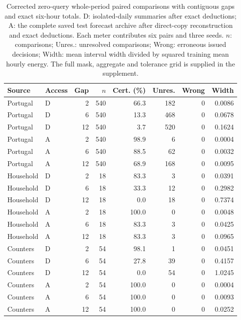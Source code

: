 \documentclass[12pt]{article}
\begin{document}
\begin{table}[htbp]
\centering\normalsize\setlength{\tabcolsep}{4pt}
\caption{Corrected zero-query whole-period paired comparisons with contiguous gaps and exact six-hour totals. D: isolated-daily summaries after exact deductions; A: the complete saved test forecast archive after direct-copy reconstruction and exact deductions. Each meter contributes six pairs and three seeds. $n$: comparisons; Unres.: unresolved comparisons; Wrong: erroneous issued decisions; Width: mean interval width divided by squared training mean hourly energy. The full mask, aggregate and tolerance grid is supplied in the supplement.}
\label{tab:period}
\begin{tabular}{llrrrrrr}
\toprule
Source & Access & Gap & $n$ & Cert. (\%) & Unres. & Wrong & Width\\
\midrule
Portugal & D & 2 & 540 & 66.3 & 182 & 0 & 0.0086\\
Portugal & D & 6 & 540 & 13.3 & 468 & 0 & 0.0678\\
Portugal & D & 12 & 540 & 3.7 & 520 & 0 & 0.1624\\
Portugal & A & 2 & 540 & 98.9 & 6 & 0 & 0.0004\\
Portugal & A & 6 & 540 & 88.5 & 62 & 0 & 0.0032\\
Portugal & A & 12 & 540 & 68.9 & 168 & 0 & 0.0095\\
Household & D & 2 & 18 & 83.3 & 3 & 0 & 0.0391\\
Household & D & 6 & 18 & 33.3 & 12 & 0 & 0.2982\\
Household & D & 12 & 18 & 0.0 & 18 & 0 & 0.7374\\
Household & A & 2 & 18 & 100.0 & 0 & 0 & 0.0048\\
Household & A & 6 & 18 & 83.3 & 3 & 0 & 0.0425\\
Household & A & 12 & 18 & 83.3 & 3 & 0 & 0.0965\\
Counters & D & 2 & 54 & 98.1 & 1 & 0 & 0.0451\\
Counters & D & 6 & 54 & 27.8 & 39 & 0 & 0.4157\\
Counters & D & 12 & 54 & 0.0 & 54 & 0 & 1.0245\\
Counters & A & 2 & 54 & 100.0 & 0 & 0 & 0.0004\\
Counters & A & 6 & 54 & 100.0 & 0 & 0 & 0.0093\\
Counters & A & 12 & 54 & 100.0 & 0 & 0 & 0.0252\\
\bottomrule
\end{tabular}
\end{table}
\end{document}
